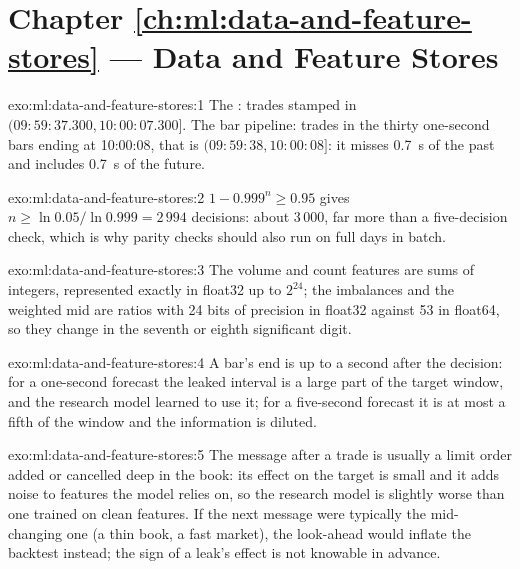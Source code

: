 \section*{Chapter \ref{ch:ml:data-and-feature-stores} --- Data and Feature Stores}

\begin{solution}{exo:ml:data-and-feature-stores:1}
The : trades stamped in $(09{:}59{:}37.300, 10{:}00{:}07.300]$. The bar pipeline: trades in the thirty one-second
bars ending at 10:00:08, that is $(09{:}59{:}38, 10{:}00{:}08]$: it misses 0.7~s of the past and includes 0.7~s of the future.
\end{solution}

\begin{solution}{exo:ml:data-and-feature-stores:2}
$1 - 0.999^n\ge0.95$ gives $n\ge\ln0.05/\ln0.999 = 2\,994$ decisions: about 3\,000, far more than a five-decision check, which is
why parity checks should also run on full days in batch.
\end{solution}

\begin{solution}{exo:ml:data-and-feature-stores:3}
The volume and count features are sums of integers, represented exactly in float32 up to $2^{24}$; the imbalances and the
weighted mid are ratios with 24 bits of precision in float32 against 53 in float64, so they change in the seventh or eighth
significant digit.
\end{solution}

\begin{solution}{exo:ml:data-and-feature-stores:4}
A bar's end is up to a second after the decision: for a one-second forecast the leaked interval is a large part of the target
window, and the research model learned to use it; for a five-second forecast it is at most a fifth of the window and the
information is diluted.
\end{solution}

\begin{solution}{exo:ml:data-and-feature-stores:5}
The message after a trade is usually a limit order added or cancelled deep in the book: its effect on the target is small and
it adds noise to features the model relies on, so the research model is slightly worse than one trained on clean features. If
the next message were typically the mid-changing one (a thin book, a fast market), the look-ahead would inflate the backtest
instead; the sign of a leak's effect is not knowable in advance.
\end{solution}

